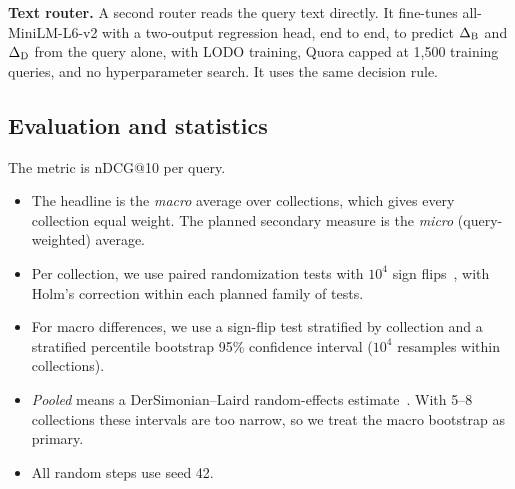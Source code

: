 \documentclass[conference]{IEEEtran}
\makeatletter
\newcommand{\B}{\textsc{B}}
\newcommand{\Dn}{\textsc{D}}
\newcommand{\ndcg}{nDCG@10}
\makeatother
\begin{document}
\textbf{Text router.} A second router reads the query text directly. It fine-tunes all-MiniLM-L6-v2 with a two-output regression head, end to end, to predict $\Delta_\B$ and $\Delta_\Dn$ from the query alone, with LODO training, Quora capped at 1,500 training queries, and no hyperparameter search. It uses the same decision rule.

\subsection{Evaluation and statistics}
The metric is \ndcg{} per query.
\begin{itemize}
\item The headline is the \emph{macro} average over collections, which gives every collection equal weight. The planned secondary measure is the \emph{micro} (query-weighted) average.
\item Per collection, we use paired randomization tests with $10^4$ sign flips~\cite{smucker2007comparison}, with Holm's correction within each planned family of tests.
\item For macro differences, we use a sign-flip test stratified by collection and a stratified percentile bootstrap 95\% confidence interval ($10^4$ resamples within collections).
\item \emph{Pooled} means a DerSimonian--Laird random-effects estimate~\cite{dersimonian1986meta}. With 5--8 collections these intervals are too narrow, so we treat the macro bootstrap as primary.
\item All random steps use seed 42.
\end{itemize}
\end{document}
